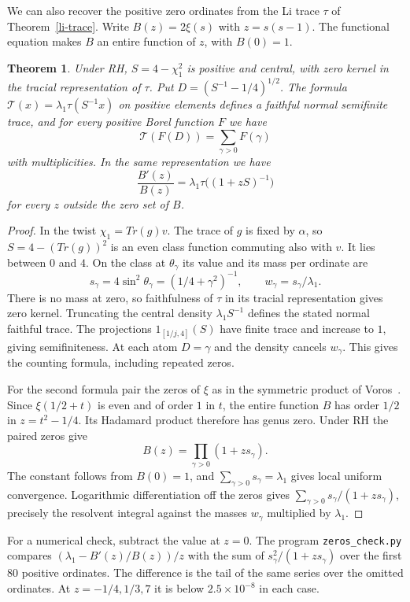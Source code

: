 \documentclass[11pt,a4paper]{article}
\newtheorem{thm}{Theorem}[section]
\begin{document}
We can also recover the positive zero ordinates from the Li trace $\tau$ of Theorem~\ref{li-trace}. Write $B(z)=2\xi(s)$ with $z=s(s-1)$. The functional equation makes $B$ an entire function of $z$, with $B(0)=1$.

\begin{samepage}
\begin{thm}\label{height}
Under RH, $S=4-\chi_1^2$ is positive and central, with zero kernel in the tracial representation of $\tau$. Put $D=(S^{-1}-1/4)^{1/2}$. The formula $\mathcal T(x)=\lambda_1\tau(S^{-1}x)$ on positive elements defines a faithful normal semifinite trace, and for every positive Borel function $F$ we have
\[
 \mathcal T(F(D))=\sum_{\gamma>0}F(\gamma)
\]
with multiplicities. In the same representation we have
\[
 \frac{B'(z)}{B(z)}=\lambda_1\tau\big((1+zS)^{-1}\big)
\]
for every $z$ outside the zero set of $B$.
\end{thm}
\end{samepage}
\begin{proof}
In the twist $\chi_1=Tr(g)v$. The trace of $g$ is fixed by $\alpha$, so $S=4-(Tr(g))^2$ is an even class function commuting also with $v$. It lies between $0$ and $4$. On the class at $\theta_\gamma$ its value and its mass per ordinate are
\[
 s_\gamma=4\sin^2\theta_\gamma=(1/4+\gamma^2)^{-1},
 \qquad w_\gamma=s_\gamma/\lambda_1 .
\]
There is no mass at zero, so faithfulness of $\tau$ in its tracial representation gives zero kernel. Truncating the central density $\lambda_1 S^{-1}$ defines the stated normal faithful trace. The projections $1_{[1/j,4]}(S)$ have finite trace and increase to $1$, giving semifiniteness. At each atom $D=\gamma$ and the density cancels $w_\gamma$. This gives the counting formula, including repeated zeros.

For the second formula pair the zeros of $\xi$ as in the symmetric product of Voros~\cite{voros,voros-li}. Since $\xi(1/2+t)$ is even and of order $1$ in $t$, the entire function $B$ has order $1/2$ in $z=t^2-1/4$. Its Hadamard product therefore has genus zero. Under RH the paired zeros give
\[
 B(z)=\prod_{\gamma>0}(1+zs_\gamma).
\]
The constant follows from $B(0)=1$, and $\sum_{\gamma>0}s_\gamma=\lambda_1$ gives local uniform convergence. Logarithmic differentiation off the zeros gives $\sum_{\gamma>0}s_\gamma/(1+zs_\gamma)$, precisely the resolvent integral against the masses $w_\gamma$ multiplied by $\lambda_1$.
\end{proof}

For a numerical check, subtract the value at $z=0$. The program \texttt{zeros\_check.py} compares $(\lambda_1-B'(z)/B(z))/z$ with the sum of $s_\gamma^2/(1+zs_\gamma)$ over the first $80$ positive ordinates. The difference is the tail of the same series over the omitted ordinates. At $z=-1/4,1/3,7$ it is below $2.5\times10^{-8}$ in each case.
\end{document}
